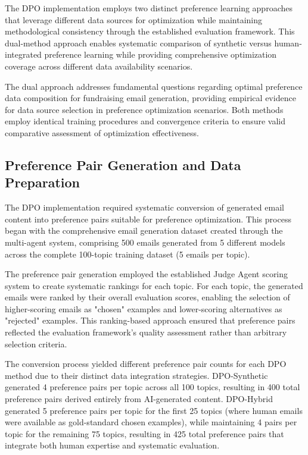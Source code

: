 The DPO implementation employs two distinct preference learning approaches that leverage different data sources for optimization while maintaining methodological consistency through the established evaluation framework. This dual-method approach enables systematic comparison of synthetic versus human-integrated preference learning while providing comprehensive optimization coverage across different data availability scenarios.

The dual approach addresses fundamental questions regarding optimal preference data composition for fundraising email generation, providing empirical evidence for data source selection in preference optimization scenarios. Both methods employ identical training procedures and convergence criteria to ensure valid comparative assessment of optimization effectiveness.

\subsection{Preference Pair Generation and Data Preparation}

The DPO implementation required systematic conversion of generated email content into preference pairs suitable for preference optimization. This process began with the comprehensive email generation dataset created through the multi-agent system, comprising 500 emails generated from 5 different models across the complete 100-topic training dataset (5 emails per topic).

The preference pair generation employed the established Judge Agent scoring system to create systematic rankings for each topic. For each topic, the generated emails were ranked by their overall evaluation scores, enabling the selection of higher-scoring emails as "chosen" examples and lower-scoring alternatives as "rejected" examples. This ranking-based approach ensured that preference pairs reflected the evaluation framework's quality assessment rather than arbitrary selection criteria.

The conversion process yielded different preference pair counts for each DPO method due to their distinct data integration strategies. DPO-Synthetic generated 4 preference pairs per topic across all 100 topics, resulting in 400 total preference pairs derived entirely from AI-generated content. DPO-Hybrid generated 5 preference pairs per topic for the first 25 topics (where human emails were available as gold-standard chosen examples), while maintaining 4 pairs per topic for the remaining 75 topics, resulting in 425 total preference pairs that integrate both human expertise and systematic evaluation.

